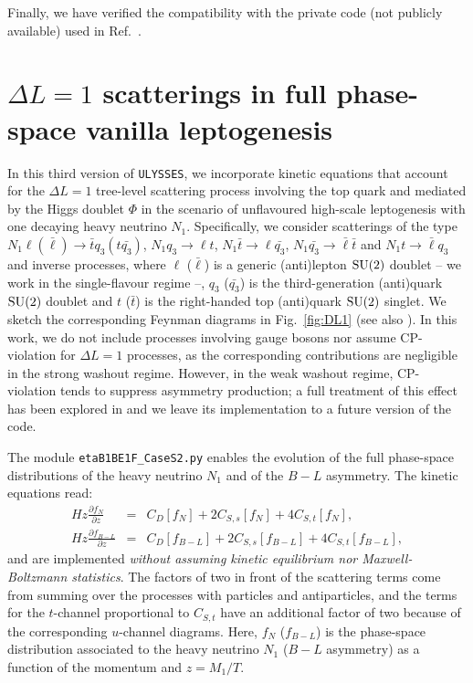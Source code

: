 \documentclass[12pt, a4paper]{article}
\begin{document}
Finally, we have verified the compatibility with the private code (not publicly available) used in Ref.~\cite{Klaric:2021cpi,Drewes:2021nqr}.


\section{$\Delta L = 1$ scatterings in full phase-space vanilla leptogenesis}\label{sec:scat}

In this third version of \texttt{ULYSSES}, we incorporate kinetic equations that account for the $\Delta L = 1$ tree-level scattering process involving the top quark and mediated by the Higgs doublet $\Phi$ in the scenario of unflavoured high-scale leptogenesis with one decaying heavy neutrino $N_1$. Specifically, we consider scatterings of the type $N_{1}\ell (\bar{\ell}) \rightarrow \bar{t} q_3 (t \bar{q_3})$, $N_{1} q_3 \rightarrow \ell t $, $N_{1} \bar{t} \rightarrow \ell \bar{q_3}$,  $N_{1}\bar{q_3} \rightarrow \bar{\ell} \bar{t}$ and $N_{1}t \rightarrow \bar{\ell} q_3$ and inverse processes, where $\ell$ ($\bar{\ell}$) is a generic (anti)lepton ${\rm SU}(2)$ doublet -- we work in the single-flavour regime --, $q_3$ ($\bar{q_3}$) is the third-generation (anti)quark ${\rm SU}(2)$ doublet and $t$ ($\bar{t}$) is the right-handed top (anti)quark ${\rm SU}(2)$ singlet. We sketch the corresponding Feynman diagrams in Fig.~\ref{fig:DL1} (see also \cite{Giudice:2003jh}). In this work, we do not include processes involving gauge bosons nor assume CP-violation for $\Delta L=1$ processes, as the corresponding contributions are
negligible in the strong washout regime. However, in the weak washout regime, CP-violation tends to suppress asymmetry production; a full treatment of this effect has been explored in \cite{Abada:2006ea} and we leave its implementation to a future version of the code.


The module \texttt{etaB1BE1F\_CaseS2.py} enables the evolution of the full phase-space distributions of the heavy neutrino $N_1$ and of the $B-L$ asymmetry. The kinetic equations read:
\begin{eqnarray}\label{eq:RHN distribution function}
   H   z \frac{\partial f_N}{\partial z}&=&C_D\left[f_N\right]+2 C_{S, s}\left[f_N\right]+4 C_{S, t}\left[f_N\right],\\
   \label{eq:BL distribution function}
 H z \frac{\partial f_{B-L}}{\partial z}&=&C_D\left[f_{B-L}\right]+2 C_{S, s}\left[f_{B-L}\right]+4 C_{S, t}\left[f_{B-L}\right],
\end{eqnarray}
and are implemented \emph{without assuming kinetic equilibrium nor Maxwell-Boltzmann statistics}. The factors of two in front of the scattering terms come from summing over the processes with particles and antiparticles, 
and the terms for the $t$-channel proportional to $C_{S,t}$ have an additional factor of two because of the corresponding $u$-channel diagrams. Here, $f_N$ ($f_{B-L}$) is the phase-space distribution associated to the heavy neutrino $N_1$ ($B-L$ asymmetry) as a function of the momentum and $z={M_1}/{T}$.
\end{document}
